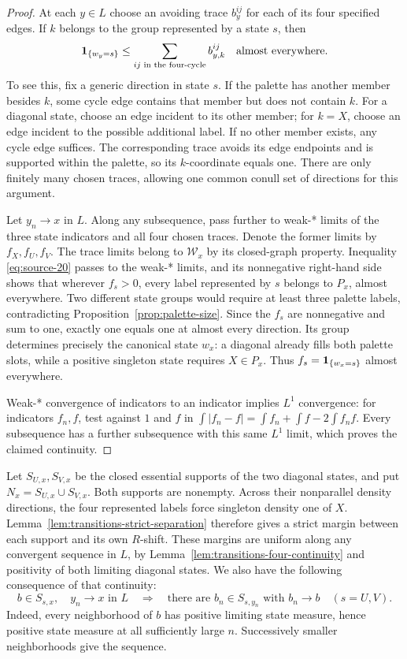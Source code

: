 \begin{proof}
At each $y\in L$ choose an avoiding trace $b_y^{ij}$ for each of its
four specified edges.  If $k$ belongs to the group represented by a
state $s$, then
\begin{equation}
 \mathbf 1_{\{w_y=s\}}
    \le\sum_{ij\text{ in the four-cycle}} b^{ij}_{y,k}
 \quad\text{almost everywhere}.
 \label{eq:source-20}
\end{equation}
To see this, fix a generic direction in state $s$.  If the palette
has another member besides $k$, some cycle edge contains that member
but does not contain $k$.  For a diagonal state, choose an edge
incident to its other member; for $k=X$, choose an edge incident to
the possible additional label.  If no other member exists, any
cycle edge suffices.  The corresponding trace avoids its edge
endpoints and is supported within the palette, so its $k$-coordinate
equals one.  There are only finitely many chosen traces, allowing one
common conull set of directions for this argument.

Let $y_n\to x$ in $L$.  Along any subsequence, pass further to weak-*
limits of the three state indicators and all four chosen traces.
Denote the former limits by $f_X,f_U,f_V$.  The trace limits belong
to $\mathcal W_x$ by its closed-graph property.  Inequality
\eqref{eq:source-20} passes to the weak-* limits, and its nonnegative
right-hand side shows that wherever $f_s>0$, every label represented
by $s$ belongs to $P_x$, almost everywhere.  Two different state
groups would require at least three palette labels, contradicting
Proposition~\ref{prop:palette-size}.  Since the $f_s$ are nonnegative
and sum to one, exactly one equals one at almost every direction.
Its group determines precisely the canonical state $w_x$: a diagonal
already fills both palette slots, while a positive singleton state
requires $X\in P_x$.  Thus $f_s=\mathbf 1_{\{w_x=s\}}$ almost everywhere.

Weak-* convergence of indicators to an indicator implies $L^1$
convergence: for indicators $f_n,f$, test against $1$ and $f$ in
$\int|f_n-f|=\int f_n+\int f-2\int f_nf$.  Every subsequence has a
further subsequence with this same $L^1$ limit, which proves the
claimed continuity.
\end{proof}

Let $S_{U,x},S_{V,x}$ be the closed essential supports of the two
diagonal states, and put $N_x=S_{U,x}\cup S_{V,x}$.  Both supports
are nonempty.  Across their nonparallel density directions, the
four represented labels force singleton density one of $X$.
Lemma~\ref{lem:transitions-strict-separation} therefore gives a strict
margin between each support and its own $R$-shift.  These margins
are uniform along any convergent sequence in $L$, by
Lemma~\ref{lem:transitions-four-continuity} and positivity of both
limiting diagonal states.  We also have the following consequence
of that continuity:
\[
 b\in S_{s,x},\quad y_n\to x\text{ in }L
 \quad\Longrightarrow\quad
 \text{there are }b_n\in S_{s,y_n}\text{ with }b_n\to b
 \quad(s=U,V).
\]
Indeed, every neighborhood of $b$ has positive limiting state
measure, hence positive state measure at all sufficiently large
$n$.  Successively smaller neighborhoods give the sequence.

